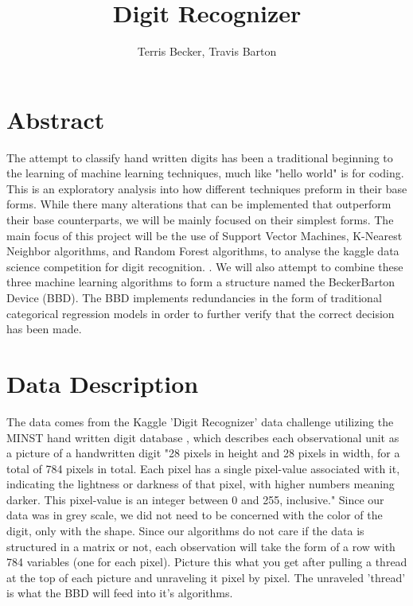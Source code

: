 \documentclass[11pt, oneside]{article}   	%
\title{Digit Recognizer}
\author{Terris Becker, Travis Barton}
\begin{document}
\maketitle
\section{Abstract}
The attempt to classify hand written digits has been a traditional beginning to the learning of machine learning techniques, much like "hello world" is for coding. This is an exploratory analysis into how different techniques preform in their base forms. While there many alterations that can be implemented that outperform their base counterparts, we will be mainly focused on their simplest forms. The main focus of this project will be the use of Support Vector Machines, K-Nearest Neighbor algorithms, and Random Forest algorithms, to analyse the kaggle data science competition for digit recognition. \cite{kagglechallange}. We will also attempt to combine these three machine learning algorithms to form a structure named the BeckerBarton Device (BBD). The BBD implements redundancies in the form of traditional categorical regression models in order to further verify that the correct decision has been made.

\section{Data Description}
The data comes from the Kaggle 'Digit Recognizer' data challenge utilizing the MINST hand written digit database \cite{kaggledata}, which describes each observational unit as a picture of a handwritten digit "28 pixels in height and 28 pixels in width, for a total of 784 pixels in total. Each pixel has a single pixel-value associated with it, indicating the lightness or darkness of that pixel, with higher numbers meaning darker. This pixel-value is an integer between 0 and 255, inclusive." Since our data was in grey scale, we did not need to be concerned with the color of the digit, only with the shape.
Since our algorithms do not care if the data is structured in a matrix or not, each observation will take the form of a row with 784 variables (one for each pixel). Picture this what you get after pulling a thread at the top of each picture and unraveling it pixel by pixel. The unraveled 'thread' is what the BBD will feed into it's algorithms.
\end{document}
